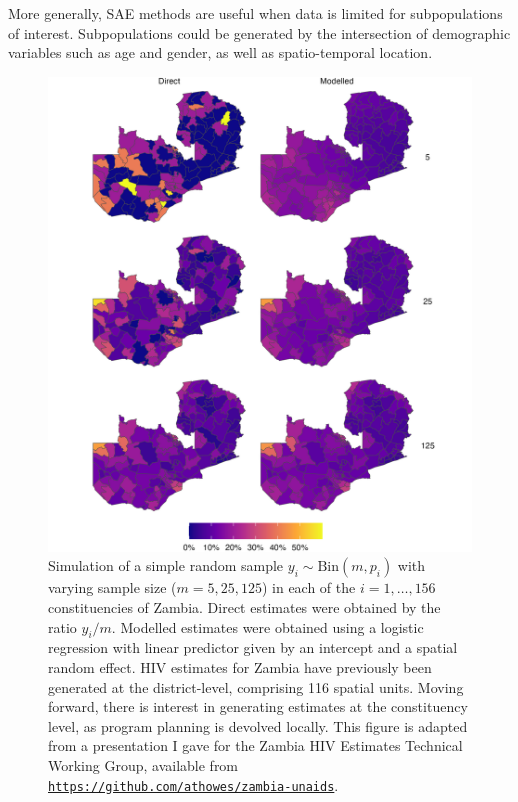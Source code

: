 \documentclass[a4paper, nobind]{templates/ociamthesis}
\begin{document}
More generally, SAE methods are useful when data is limited for subpopulations of interest.
Subpopulations could be generated by the intersection of demographic variables such as age and gender, as well as spatio-temporal location.



\begin{figure}

{\centering \includegraphics[width=0.95\linewidth]{figures/bayesian/zmb-maps} 

}

\caption{Simulation of a simple random sample \(y_i \sim \text{Bin}(m, p_i)\) with varying sample size (\(m = 5, 25, 125\)) in each of the \(i = 1, \ldots, 156\) constituencies of Zambia. Direct estimates were obtained by the ratio \(y_i / m\). Modelled estimates were obtained using a logistic regression with linear predictor given by an intercept and a spatial random effect. HIV estimates for Zambia have previously been generated at the district-level, comprising 116 spatial units. Moving forward, there is interest in generating estimates at the constituency level, as program planning is devolved locally. This figure is adapted from a presentation I gave for the Zambia HIV Estimates Technical Working Group, available from \href{https://github.com/athowes/zambia-unaids}{\texttt{https://github.com/athowes/zambia-unaids}}.}\label{fig:zmb-maps}
\end{figure}
\end{document}
